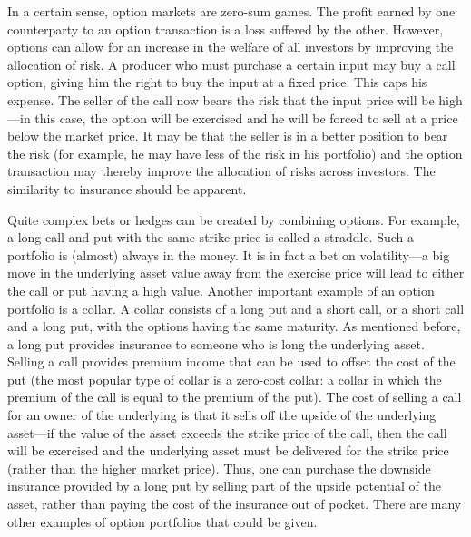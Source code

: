 In a certain sense, option markets are zero-sum games.  The profit earned by one counterparty to an option transaction is a loss suffered by the other.  However, options can allow for an increase in the welfare of all investors by improving the allocation of risk.  A producer who must purchase a certain input may buy a call option, giving him the right to buy the input at a fixed price.  This caps his expense.  The seller of the call now bears the risk that the input price will be high---in this case, the option will be exercised and he will be forced to sell at a price below the market price.  It may be that the seller is in a better position to bear the risk (for example, he may have less of the risk in his portfolio) and the option transaction may thereby improve the allocation of risks across investors.  The similarity to insurance should be apparent.

Quite complex bets or hedges can be created by combining options.  For example, a long call and put with the same strike price is called a straddle.   Such a portfolio is (almost) always in the money.  It is in fact a bet on volatility---a big move in the underlying asset value away from the exercise price will lead to either the call or put having a high value.  Another important example of an option portfolio is a collar.   A collar consists of a long put and a short call, or a short call and a long put, with the options having the same maturity.  As mentioned before, a long put provides insurance to someone who is long the underlying asset.  Selling a call provides premium income that can be used to offset the cost of the put (the most popular type of collar is a zero-cost collar:  a collar in which the premium of the call is equal to the premium of the put).  The cost of selling a call for an owner of the underlying is that it sells off the upside of the underlying asset---if the value of the asset exceeds the strike price of the call, then the call will be exercised and the underlying asset must be delivered for the strike price (rather than the higher market price).  Thus, one can purchase the downside insurance provided by a long put by selling part of the upside potential of the asset, rather than paying the cost of the insurance out of pocket.  There are many other examples of option portfolios that could be given.  

